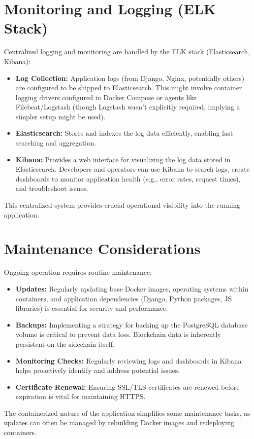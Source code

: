 \section{Monitoring and Logging (ELK Stack)}
\label{sec:elk_monitoring}
Centralized logging and monitoring are handled by the ELK stack (Elasticsearch, Kibana):
\begin{itemize}
    \item \textbf{Log Collection:} Application logs (from Django, Nginx, potentially others) are configured to be shipped to Elasticsearch. This might involve container logging drivers configured in Docker Compose or agents like Filebeat/Logstash (though Logstash wasn't explicitly required, implying a simpler setup might be used).
    \item \textbf{Elasticsearch:} Stores and indexes the log data efficiently, enabling fast searching and aggregation.
    \item \textbf{Kibana:} Provides a web interface for visualizing the log data stored in Elasticsearch. Developers and operators can use Kibana to search logs, create dashboards to monitor application health (e.g., error rates, request times), and troubleshoot issues.
\end{itemize}
This centralized system provides crucial operational visibility into the running application.

\section{Maintenance Considerations}
\label{sec:maintenance}
Ongoing operation requires routine maintenance:
\begin{itemize}
    \item \textbf{Updates:} Regularly updating base Docker images, operating systems within containers, and application dependencies (Django, Python packages, JS libraries) is essential for security and performance.
    \item \textbf{Backups:} Implementing a strategy for backing up the PostgreSQL database volume is critical to prevent data loss. Blockchain data is inherently persistent on the sidechain itself.
    \item \textbf{Monitoring Checks:} Regularly reviewing logs and dashboards in Kibana helps proactively identify and address potential issues.
    \item \textbf{Certificate Renewal:} Ensuring SSL/TLS certificates are renewed before expiration is vital for maintaining HTTPS.
\end{itemize}
The containerized nature of the application simplifies some maintenance tasks, as updates can often be managed by rebuilding Docker images and redeploying containers.
